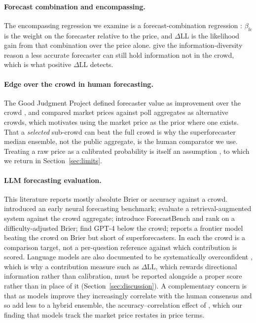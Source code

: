 \documentclass[11pt]{article}
\begin{document}
\paragraph{Forecast combination and encompassing.} The encompassing regression we examine is a forecast-combination regression \citep{bates1969,granger1984,fair1990,clements2010}: $\beta_{\mathrm{fc}}$ is the weight on the forecaster relative to the price, and $\Delta$LL is the likelihood gain from that combination over the price alone. \citet{satopaa2014} give the information-diversity reason a less accurate forecaster can still hold information not in the crowd, which is what positive $\Delta$LL detects.

\paragraph{Edge over the crowd in human forecasting.} The Good Judgment Project defined forecaster value as improvement over the crowd \citep{mellers2014,mellers2015}, and \citet{atanasov2017} compared market prices against poll aggregates as alternative crowds, which motivates using the market price as the prior where one exists. That a \emph{selected} sub-crowd can beat the full crowd \citep{mannes2014} is why the superforecaster median ensemble, not the public aggregate, is the human comparator we use. Treating a raw price as a calibrated probability is itself an assumption \citep{wolfers2006}, to which we return in Section~\ref{sec:limits}.

\paragraph{LLM forecasting evaluation.} This literature reports mostly absolute Brier or accuracy against a crowd. \citet{zou2022} introduced an early neural forecasting benchmark; \citet{halawi2024} evaluate a retrieval-augmented system against the crowd aggregate; \citet{karger2024} introduce ForecastBench and rank on a difficulty-adjusted Brier; \citet{schoenegger2023} find GPT-4 below the crowd; \citet{lu2025} reports a frontier model beating the crowd on Brier but short of superforecasters. In each the crowd is a comparison target, not a per-question reference against which contribution is scored. Language models are also documented to be systematically overconfident \citep{kadavath2022,tian2023}, which is why a contribution measure such as $\Delta$LL, which rewards directional information rather than calibration, must be reported alongside a proper score rather than in place of it (Section~\ref{sec:discussion}). A complementary concern is that as models improve they increasingly correlate with the human consensus and so add less to a hybrid ensemble, the accuracy--correlation effect of \citet{jeddi2026}, which our finding that models track the market price restates in price terms.
\end{document}
